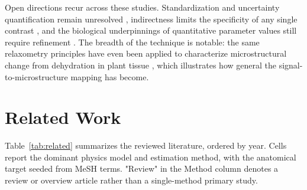 \documentclass[sn-mathphys,Numbered]{sn-jnl}
\begin{document}
Open directions recur across these studies.
Standardization and uncertainty quantification remain unresolved \cite{pmid33710907}, indirectness limits the specificity of any single contrast \cite{pmid29097317}, and the biological underpinnings of quantitative parameter values still require refinement \cite{pmid36040334}.
The breadth of the technique is notable: the same relaxometry principles have even been applied to characterize microstructural change from dehydration in plant tissue \cite{pmid34964166}, which illustrates how general the signal-to-microstructure mapping has become.

\section{Related Work}\label{sec:related}
Table~\ref{tab:related} summarizes the reviewed literature, ordered by year. Cells report the dominant physics model and estimation method, with the anatomical target seeded from MeSH terms. "Review" in the Method column denotes a review or overview article rather than a single-method primary study.
\end{document}
